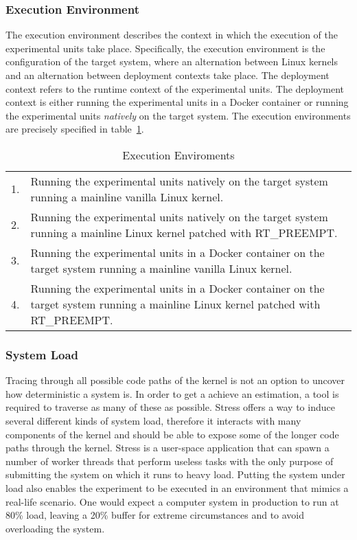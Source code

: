 \subsubsection{Execution Environment}
The execution environment describes the context in which the execution of the experimental units take place. Specifically, the execution environment is the configuration of the target system, where an alternation between Linux kernels and an alternation between deployment contexts take place. The deployment context refers to the runtime context of the experimental units. The deployment context is either running the experimental units in a Docker container or running the experimental units \textit{natively} on the target system. The execution environments are precisely specified in table~\ref{table:exe-env}.

\begin{table}[ht]
\begin{tabular}{l|p{14cm}}
1. & Running the experimental units natively on the target system running a mainline vanilla Linux kernel.                               \\
2. & Running the experimental units natively on the target system running a mainline Linux kernel patched with RT\_PREEMPT.              \\
3. & Running the experimental units in a Docker container on the target system running a mainline vanilla Linux kernel.                  \\
4. & Running the experimental units in a Docker container on the target system running a mainline Linux kernel patched with RT\_PREEMPT.
\end{tabular}
\centering
\caption{Execution Enviroments}
\label{table:exe-env}
\end{table}


\subsubsection{System Load}
Tracing through all possible code paths of the kernel is not an option to uncover how deterministic a system is. In order to get a achieve an estimation, a tool is required to traverse as many of these as possible. Stress offers a way to induce several different kinds of system load, therefore it interacts with many components of the kernel and should be able to expose some of the longer code paths through the kernel. Stress is a user-space application that can spawn a number of worker threads that perform useless tasks with the only purpose of submitting the system on which it runs to heavy load. Putting the system under load also enables the experiment to be executed in an environment that mimics a real-life scenario. One would expect a computer system in production to run at 80\% load, leaving a 20\% buffer for extreme circumstances and to avoid overloading the system.  


